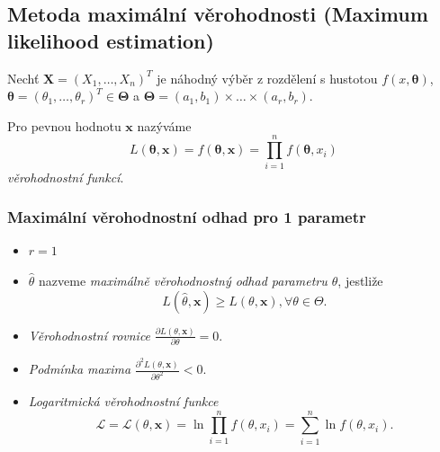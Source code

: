 \documentclass[a4]{report}
\theoremstyle{definition}
\begin{document}
{\subsection{Metoda maximální věrohodnosti (Maximum likelihood estimation)} 
Nechť $\mathbf{X}=\left(X_1,\ldots,X_n\right)^T$ je náhodný výběr z rozdělení s hustotou $f\left( x,\pmb{\theta}\right)$, $\pmb{\theta}=\left(\theta_1,\ldots,\theta_r\right)^T \in \pmb{\Theta}$ a $\pmb{\Theta} = \left(a_1, b_1\right)\times \ldots \times \left(a_r, b_r\right)$.

Pro pevnou hodnotu $\mathbf{x}$ nazýváme $$L \left(\pmb{\theta}, \mathbf{x} \right) = f\left(\pmb{\theta}, \mathbf{x} \right) = \prod_{i=1}^{n} f\left(\pmb{\theta},x_i \right) $$ \textit{věrohodnostní funkcí}.

\subsubsection{Maximální věrohodnostní odhad pro 1 parametr}
\begin{itemize}
\item $r=1$
\item $\hat{\theta}$ nazveme \textit{maximálně věrohodnostný odhad parametru $\theta$}, jestliže $$L \left(\hat{\theta}, \mathbf{x} \right) \geq L \left(\theta, \mathbf{x} \right), \forall \theta \in \Theta.$$
\item \textit{Věrohodnostní rovnice} $\frac{\partial L \left(\theta, \mathbf{x} \right)}{\partial \theta} = 0.$
\item \textit{Podmínka maxima} $\frac{\partial^2 L \left(\theta, \mathbf{x} \right)}{\partial \theta^2} < 0.$
\item \textit{Logaritmická věrohodnostní funkce} $$\mathcal{L} = \mathcal{L} \left(\theta, \mathbf{x} \right) = \ln \prod_{i=1}^{n} f\left(\theta,x_i \right) = \sum_{i=1}^{n} \ln f\left(\theta,x_i \right).$$
\end{itemize}

}
\end{document}
